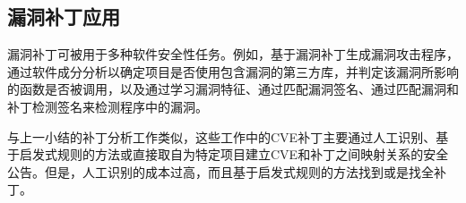 \subsection{漏洞补丁应用}
漏洞补丁可被用于多种软件安全性任务。例如，基于漏洞补丁生成漏洞攻击程序\cite{brumley2008automatic,you2017semfuzz}，通过软件成分分析以确定项目是否使用包含漏洞的第三方库，并判定该漏洞所影响的函数是否被调用\cite{pashchenko2018vulnerable,ponta2020detection,pashchenko2020vuln4real,Wang2020empirical}，以及通过学习漏洞特征\cite{li2016vulpecker,li2018vuldeepecker,zhou2019devign,jimenez2019importance}、通过匹配漏洞签名\cite{jang2012redebug,kim2017vuddy}、通过匹配漏洞和补丁检测签名\cite{xu2020patch,xiao2020mvp,cui2020vuldetector}来检测程序中的漏洞。


与上一小结的补丁分析工作类似，这些工作中的CVE补丁主要通过人工识别\cite{pashchenko2018vulnerable,ponta2020detection,pashchenko2020vuln4real,xiao2020mvp}、基于启发式规则的方法\cite{li2016vulpecker,li2018vuldeepecker,you2017semfuzz,Wang2020empirical,jimenez2019importance}或直接取自为特定项目建立CVE和补丁之间映射关系的安全公告\cite{jang2012redebug,kim2017vuddy,xu2020patch}。但是，人工识别的成本过高，而且基于启发式规则的方法找到或是找全补丁。